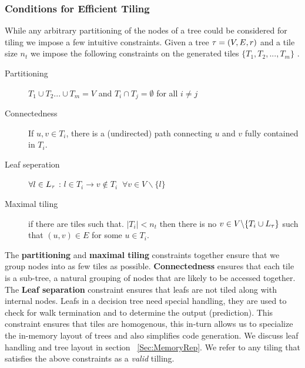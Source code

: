 \subsubsection*{Conditions for Efficient Tiling}
\label{sec:ValidTiling}
While any arbitrary partitioning of the nodes of a tree could be considered for tiling we impose a few intuitive constraints.
Given a tree $\operatorname{\tau} = (V, E, r)$ and a tile size $n_t$ we impose the following constraints on the generated tiles $\{ T_1, T_2, ... ,T_m \}$ .
\begin{description}
    \item[Partitioning] $T_1 \cup T_2 ... \cup T_m = V$ and $T_i \cap T_j = \emptyset$ for all $i\neq j$
    \item[Connectedness] If $u, v \in T_i$, there is a (undirected) path connecting $u$ and $v$ fully contained in $T_i$.
   \item [Leaf seperation] $\forall l \in L_{\operatorname{\tau}}$ : $l \in T_i \rightarrow v \notin T_i \;\; \forall v \in V \backslash \{l\}$
  \item [Maximal tiling] if there are tiles such that. $|T_i| < n_t$ then there is no $v \in V\backslash \{ T_i \cup L_{\operatorname{\tau}} \}$ such that $(u, v) \in E$ for some $u \in T_i$. 
\end{description}
The \textbf{partitioning} and \textbf{maximal tiling} constraints together ensure that we group nodes into as few tiles as possible. {\textbf{Connectedness}} ensures that each tile is a sub-tree, a natural grouping of nodes that are likely to be accessed together. The {\textbf{Leaf separation}} constraint ensures that leafs are not tiled along with internal nodes. Leafs in a decision tree need special handling, they are used to check for walk termination and to determine the output (prediction). This constraint ensures that tiles are homogenous, this in-turn allows us to specialize the in-memory layout of trees and also simplifies code generation. We discuss leaf handling and tree layout in section ~\ref{Sec:MemoryRep}. We refer to any tiling that satisfies the above constraints as a \emph{valid} tilling.

